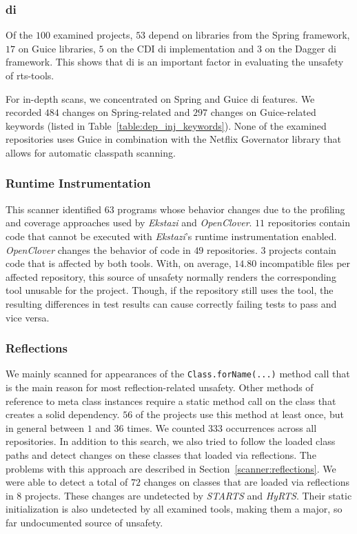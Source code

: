 \subsubsection{\acf{di}}
Of the $100$ examined projects, $53$ depend on libraries from the Spring framework, $17$ on Guice
libraries, $5$ on the CDI \ac{di} implementation and $3$ on the Dagger \ac{di} framework. This shows
that \ac{di} is an important factor in evaluating the unsafety of \ac{rts}-tools.

For in-depth scans, we concentrated on Spring and Guice \ac{di} features. We recorded $484$ changes on
Spring-related and $297$ changes on Guice-related keywords (listed in
Table~\ref{table:dep_inj_keywords}). None of the examined repositories uses Guice in combination with the
Netflix Governator library that allows for automatic classpath scanning.

\subsubsection{Runtime Instrumentation}
This scanner identified $63$ programs whose behavior changes due to the
profiling and coverage approaches used by \emph{Ekstazi} and \emph{OpenClover}. $11$ repositories
contain code that cannot be executed with \emph{Ekstazi}'s runtime instrumentation enabled. 
\emph{OpenClover} changes the behavior of
code in $49$ repositories. $3$ projects contain code that is affected by both tools. 
With, on average, $14.80$ incompatible files per
affected repository, this source of unsafety normally renders the corresponding tool unusable for
the project. Though, if the repository still uses the tool, the resulting differences in test
results can cause correctly failing tests to pass and vice versa.

\subsubsection{Reflections}
We mainly scanned for appearances of the \texttt{Class.forName(...)} method call
that is the main reason for most reflection-related unsafety. Other methods of reference to meta
class instances require a static method call on the class that creates a solid dependency. $56$
of the projects use this method at least once, but in general between $1$ and $36$ times. We counted
$333$ occurrences across all repositories. In addition to this search, we also tried to follow the
loaded class paths and detect changes on these classes that loaded via reflections. The problems
with this approach are described in Section~\ref{scanner:reflections}. We were able to
detect a total of $72$ changes on classes that are loaded via reflections in $8$ projects. These
changes are undetected by \emph{STARTS} and \emph{HyRTS}. Their
static initialization is also undetected by all examined tools, making them a major, so far
undocumented source of unsafety.

